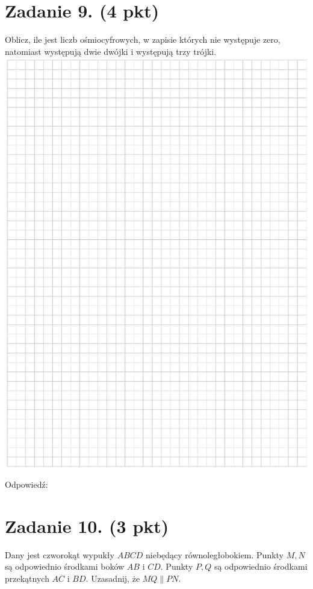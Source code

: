 \documentclass[10pt]{article}
\begin{document}
\section*{Zadanie 9. (4 pkt)}
Oblicz, ile jest liczb ośmiocyfrowych, w zapisie których nie występuje zero, natomiast występują dwie dwójki i występują trzy trójki.\\
\includegraphics[max width=\textwidth, center]{2024_11_21_b36d8cbb94edb763da2cg-14}

Odpowiedź:

\section*{Zadanie 10. (3 pkt)}
Dany jest czworokąt wypukły \(A B C D\) niebędący równoległobokiem. Punkty \(M, N\) są odpowiednio środkami boków \(A B\) i \(C D\). Punkty \(P, Q\) są odpowiednio środkami przekątnych \(A C\) i \(B D\). Uzasadnij, że \(M Q \| P N\).
\end{document}
